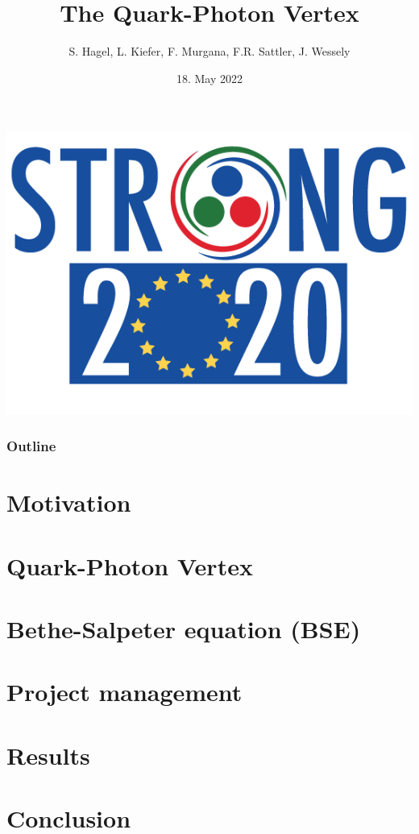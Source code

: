 \documentclass[pt12]{beamer}
\title[ECT* DTP 2022]{The Quark-Photon Vertex}
\author{S. Hagel, L. Kiefer, F. Murgana, F.R. Sattler, J. Wessely}
\date{18. May 2022}
\begin{document}
  \begin{frame}[plain]
    \titlepage
    \begin{center}
      \includegraphics[width=0.45\linewidth]{graphics/Logo_STRONG_vert- trasparente}
    \end{center}
  \end{frame}

  \begin{frame}[label=outline]\frametitle{Outline}
    \tableofcontents
  \end{frame}

  \section{Motivation}\label{sec:1}
  


  \section{Quark-Photon Vertex}\label{sec:2}
    

  \section{Bethe-Salpeter equation (BSE)}\label{sec:3}
    
    
    
    

  \section{Project management}\label{sec:4}
    

  \section{Results}\label{sec:5}
    
    
   \section{Conclusion}\label{sec:6}
   
\end{document}
